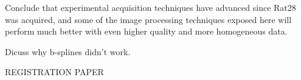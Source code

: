     Conclude that experimental acquisition techniques have advanced since Rat28 was acquired, and some of the image processing techniques exposed here will perform much better with even higher quality and more homogeneous data.
    
    Dicuss why b-splines didn't work.

REGISTRATION PAPER

% 
% 
  